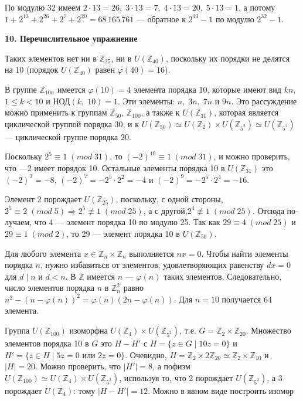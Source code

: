 \documentclass{mai_book}
\begin{document}
По модулю 32 имеем $2\cdot 13=26,\; 3\cdot 13=7,\; 4\cdot 13=20,\; 5\cdot 13=1$,
а потому $1+2^{13}+2^{26}+2^7+2^{20}=68\,165\,761$ --- обратное к $2^{13}-1$ по
модулю $2^{32}-1$.

\bigskip
\noindent \textbf{10. Перечислительное упражнение}

\medskip
Таких элементов нет ни в $\mathbb{Z}_{25}$, ни в $U(\mathbb{Z}_{40})$, поскольку их порядки не делятся на 10 (порядок $U(\mathbb{Z}_{40})$ равен $\varphi (40)=16$).

В группе $\mathbb{Z}_{10n}$ имеется $\varphi (10)=4$ элемента порядка 10, которые имеют вид $kn$, $1\leq k< 10$ и НОД$(k,\;10)=1$. 
Эти элементы: $n,\; 3n,\; 7n$ и $9n$. 
Это рассуждение можно применить к группам $\mathbb{Z}_{50}$, $\mathbb{Z}_{100}$, а
также к $U(\mathbb{Z}_{31})$, которая является циклической группой порядка 30, и
к $U(\mathbb{Z}_{50}) \simeq U(\mathbb{Z}_{2}) \times U(\mathbb{Z}_{5^2})\simeq U(\mathbb{Z}_{5^2})$ --- циклической группе порядка 20.

Поскольку $2^5\equiv 1\; (mod\; 31)$, то $(-2)^{10}\equiv 1\; (mod\; 31)$, и можно про­верить, что —2 имеет порядок 10. Остальные элементы порядка 10 в
$U(\mathbb{Z}_{31})$ это $(-2)^3=-8$, $(-2)^7=-2^5\cdot 2^2=-4$ и $(-2)^9=-2^5\cdot 2^4=-16$.

\newpage


Элемент 2 порождает $U(\mathbb{Z}_{25})$, поскольку, с одной стороны, $2^5\equiv 2\; (mod\; 5)\Rightarrow 2^5\not\equiv 1\; (mod\; 25)$, а с другой,$2^4\not\equiv 1\; (mod\; 25)$. 
Отсюда по­лучаем, что 4 — элемент порядка 10 по модулю 25. Так как $29\equiv 4\;(mod\; 25)$ и $29 \equiv 1\; (mod\; 2)$, то 29 — элемент порядка 10 в $U(\mathbb{Z}_{50})$.

Для любого элемента $x\in \mathbb{Z}_n\times \mathbb{Z}_n$ выполняется $nx=0$. 
Чтобы найти элементы порядка $n$, нужно избавиться от элементов, удовлетворяю­щих равенству $dx=0$ для $d\; |\; n$ и $d<n$. В $\mathbb{Z}$
 имеется $n$ --- $\varphi(n)$ та­ких элементов. 
Следовательно, число элементов порядка $n$ в $\mathbb{Z}^2_n$ равно $n^2-(n-\varphi(n))^2=\varphi(n)(2n-\varphi(n))$.
Для $n=10$ получается 64 элемента.

Группа $U(\mathbb{Z}_{100})$ изоморфна $U(\mathbb{Z}_{4})\times U(\mathbb{Z}_{5^2})$, т.е. $G=\mathbb{Z}_{2}\times\mathbb{Z}_{20}$.
Множество элементов порядка 10 в $G$ это $H-H'$ с $H=\{z\in G\;|\;10z=0\}$ и $H'=\{z\in H\;|\;5z=0$ или $2z=0\}$. 
Очевидно, $H=\mathbb{Z}_2\times2\mathbb{Z}_{20}\simeq \mathbb{Z}_2\times \mathbb{Z}_{10}$
и $|H|=20$. 
Можно проверить, что $|H'|=8$, а пофизм $U(\mathbb{Z}_{100})\simeq U(\mathbb{Z}_{4})\times U(\mathbb{Z}_{5^2})$, используя то, что 2 порождает $U(\mathbb{Z}_{5^2})$, а 3 порождает $U(\mathbb{Z}_4)$:
тому $|H-H'|=12$.
Можно в явном виде построить изомор
\end{document}
